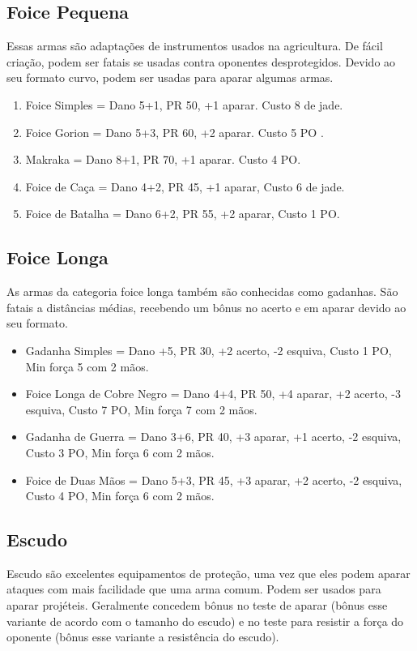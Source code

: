 \subsection{Foice Pequena}
Essas armas são adaptações de instrumentos usados na agricultura. De fácil criação, podem ser fatais se usadas contra oponentes desprotegidos. Devido ao seu formato curvo, podem ser usadas para aparar algumas armas.

\begin{enumerate}
	\item Foice Simples = Dano 5+1, PR 50, +1 aparar. Custo 8 de jade.
	\item Foice Gorion = Dano 5+3, PR 60, +2 aparar. Custo 5 PO .
	\item Makraka = Dano 8+1, PR 70, +1 aparar. Custo 4 PO.
	\item Foice de Caça = Dano 4+2, PR 45, +1 aparar, Custo 6 de jade.
	\item Foice de Batalha = Dano 6+2, PR 55, +2 aparar, Custo 1 PO.
\end{enumerate}


\subsection{Foice Longa}
As armas da categoria foice longa também são conhecidas como gadanhas. São fatais a distâncias médias, recebendo um bônus no acerto e em aparar devido ao seu formato.

\begin{itemize}	
	\item Gadanha Simples = Dano +5, PR 30, +2 acerto, -2 esquiva, Custo 1 PO, Min força 5 com 2 mãos.
	\item Foice Longa de Cobre Negro = Dano 4+4, PR 50, +4 aparar, +2 acerto, -3 esquiva, Custo 7 PO, Min força 7 com 2 mãos.
	\item Gadanha de Guerra = Dano 3+6, PR 40, +3 aparar, +1 acerto, -2 esquiva, Custo 3 PO, Min força 6 com 2 mãos.
	\item Foice de Duas Mãos = Dano 5+3, PR 45, +3 aparar, +2 acerto, -2 esquiva, Custo 4 PO, Min força 6 com 2 mãos.
\end{itemize}	

\subsection{Escudo}
Escudo são excelentes equipamentos de proteção, uma vez que eles podem aparar ataques com mais facilidade que uma arma comum. Podem ser usados para aparar projéteis. Geralmente concedem bônus no teste de aparar (bônus esse variante de acordo com o tamanho do escudo) e no teste para resistir a força do oponente (bônus esse variante a resistência do escudo).

